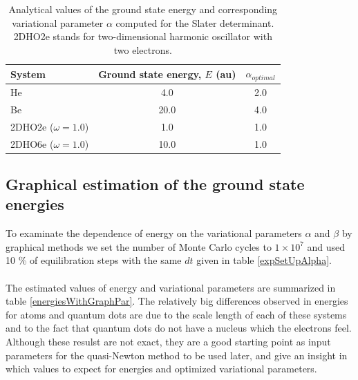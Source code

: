 	
\begin{table}
\centering
\begin{tabular}{lcc}
\toprule[1pt]
\textbf{System} & \textbf{Ground state energy}, $E$ (au) & $\alpha_{optimal}$ \\
\midrule[1pt]
He  		&  4.0 	&   2.0 \\
Be  		& 20.0 	&   4.0 \\
2DHO2e ($\omega=1.0$)	& 1.0 	&   1.0 \\
2DHO6e ($\omega = 1.0$)	&  10.0  & 	1.0  \\
\bottomrule[1pt]
\end{tabular}\caption{Analytical values of the ground state energy and corresponding variational parameter $\alpha$ computed for the Slater determinant. 2DHO2e stands for two-dimensional harmonic oscillator with two electrons.}
\label{analyticalEnergyvsAlpha}
\end{table}


\subsection{Graphical estimation of the ground state energies}\label{graphicalOptimization}

To examinate the dependence of energy on the variational parameters $\alpha$ and $\beta$ by graphical methods we set the number of Monte Carlo cycles to $1 \times 10^7$ and used 10 \% of equilibration steps with the same $dt$ given in table \ref{expSetUpAlpha}.\\
\\
The estimated values of energy and variational parameters are summarized in table \ref{energiesWithGraphPar}. The relatively big differences observed in energies for atoms and quantum dots are due to the scale length of each of these systems and to the fact that quantum dots do not have a nucleus which the electrons feel. Although these resulst are not exact, they are a good starting point as input parameters for the quasi-Newton method to be used later, and give an insight in which values to expect for energies and optimized variational parameters.\\

